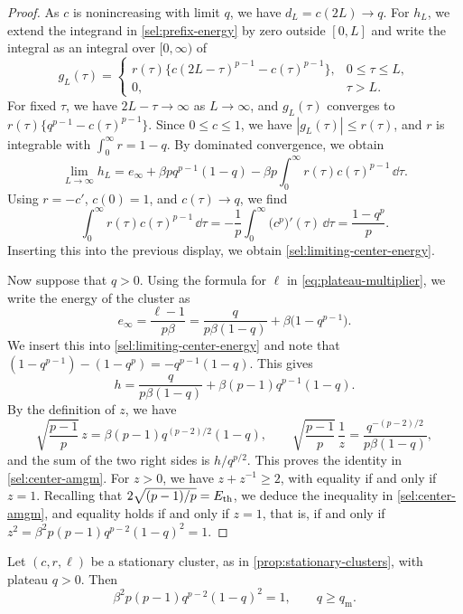 \begin{proof}
As $c$ is nonincreasing with limit $q$, we have $d_L=c(2L)\to q$. For $h_L$, we extend the integrand in \eqref{sel:prefix-energy} by zero outside $[0,L]$ and write the integral as an integral over $[0,\infty)$ of
\[
 g_L(\tau)=
 \begin{cases}
 r(\tau)\bigl\{c(2L-\tau)^{p-1}-c(\tau)^{p-1}\bigr\},&0\le\tau\le L,\\
 0,&\tau>L.
 \end{cases}
\]
For fixed $\tau$, we have $2L-\tau\to\infty$ as $L\to\infty$, and $g_L(\tau)$ converges to $r(\tau)\{q^{p-1}-c(\tau)^{p-1}\}$. Since $0\le c\le1$, we have $|g_L(\tau)|\le r(\tau)$, and $r$ is integrable with $\int_0^\infty r=1-q$. By dominated convergence, we obtain
\[
 \lim_{L\to\infty}h_L
 =e_\infty+\beta pq^{p-1}(1-q)-\beta p\int_0^\infty r(\tau)c(\tau)^{p-1}\,\dd\tau.
\]
Using $r=-c'$, $c(0)=1$, and $c(\tau)\to q$, we find
\[
 \int_0^\infty r(\tau)c(\tau)^{p-1}\,\dd\tau
 =-\frac1p\int_0^\infty\bigl(c^p\bigr)'(\tau)\,\dd\tau
 =\frac{1-q^p}p.
\]
Inserting this into the previous display, we obtain \eqref{sel:limiting-center-energy}.

Now suppose that $q>0$. Using the formula for $\ell$ in \eqref{eq:plateau-multiplier}, we write the energy of the cluster as
\[
 e_\infty=\frac{\ell-1}{p\beta}=\frac{q}{p\beta(1-q)}+\beta\bigl(1-q^{p-1}\bigr).
\]
We insert this into \eqref{sel:limiting-center-energy} and note that $(1-q^{p-1})-(1-q^p)=-q^{p-1}(1-q)$. This gives
\[
 h=\frac{q}{p\beta(1-q)}+\beta(p-1)q^{p-1}(1-q).
\]
By the definition of $z$, we have
\[
 \sqrt{\frac{p-1}p}\,z=\beta(p-1)q^{(p-2)/2}(1-q),
 \qquad
 \sqrt{\frac{p-1}p}\,\frac1z=\frac{q^{-(p-2)/2}}{p\beta(1-q)},
\]
and the sum of the two right sides is $h/q^{p/2}$. This proves the identity in \eqref{sel:center-amgm}. For $z>0$, we have $z+z^{-1}\ge2$, with equality if and only if $z=1$. Recalling that $2\sqrt{(p-1)/p}=E_{\mathrm{th}}$, we deduce the inequality in \eqref{sel:center-amgm}, and equality holds if and only if $z=1$, that is, if and only if $z^2=\beta^2p(p-1)q^{p-2}(1-q)^2=1$.
\end{proof}

\begin{lemma}\label{sel:positive-marginality}
Let $(c,r,\ell)$ be a stationary cluster, as in \cref{prop:stationary-clusters}, with plateau $q>0$. Then
\begin{equation}
 \beta^2p(p-1)q^{p-2}(1-q)^2=1,
 \qquad q\ge q_{\mathrm m}.
 \label{sel:positive-plateau-equation}
\end{equation}
\end{lemma}

